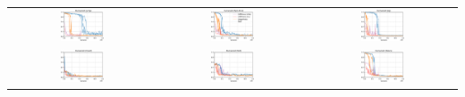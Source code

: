 \begin{table}[h!]
\begin{tabular}{ccc}
         \\
         \hspace{-10pt}\includegraphics[width=0.31\textwidth]{figures/mixed_jump.png}
         &
         \includegraphics[width=0.31\textwidth]{figures/mixed_spinkick_legend.png}
         &
         \includegraphics[width=0.31\textwidth]{figures/mixed_jog.png}
         \\
         \hspace{-10pt}\includegraphics[width=0.31\textwidth]{figures/mixed_crawl.png}
         &
         \includegraphics[width=0.31\textwidth]{figures/mixed_roll.png}
          &
         \includegraphics[width=0.31\textwidth]{figures/mixed_dance.png}
         
    \end{tabular}
    \label{fig:imitate_one_full}
\end{table}




